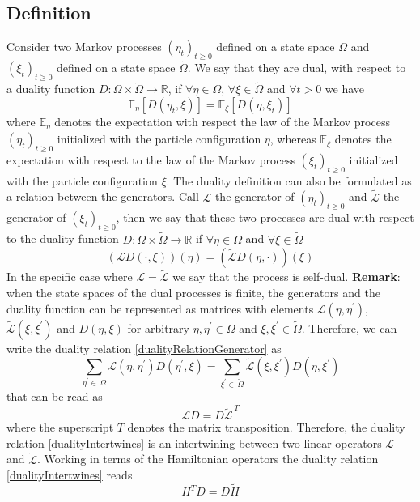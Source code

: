 \documentclass[10pt]{article}
\numberwithin{equation}{section}
\numberwithin{equation}{subsection}
\begin{document}
\subsection{Definition}
Consider two Markov processes $(\eta_{t})_{t\geq 0}$ defined on a state space $\Omega$ and $(\xi_{t})_{t\geq 0}$ defined on a state space $\widetilde{\Omega}$. We say that they are dual, with respect to a duality function $D:\Omega\times \widetilde{\Omega}\to \mathbb{R}$, if $\forall \eta\in\Omega$, $\forall \xi\in\widetilde{\Omega}$ and $\forall t> 0$ we have 
\begin{equation}
    \mathbb{E}_{\eta}\left[D(\eta_{t},\xi)\right]=\mathbb{E}_{\xi}\left[D(\eta,\xi_{t})\right]
\end{equation}
where $\mathbb{E}_{\eta}$ denotes the expectation with respect the law of the Markov process $(\eta_{t})_{t\geq 0}$ initialized with the particle configuration $\eta$, whereas $\mathbb{E}_{\xi}$ denotes the expectation with respect to the law of the Markov process $(\xi_{t})_{t\geq 0}$ initialized with the particle configuration $\xi$.
The duality definition can also be formulated as a relation between the generators. Call $\mathcal{L}$ the generator of $(\eta_{t})_{t\geq0}$ and $\widetilde{\mathcal{L}}$ the generator of $(\xi_{t})_{t\geq 0}$, then we say that these two processes are dual with respect to the duality function $D:\Omega\times \widetilde{\Omega}\to \mathbb{R}$ if $\forall \eta\in\Omega$ and $\forall \xi\in\widetilde{\Omega}$
\begin{equation}\label{dualityRelationGenerator}
    \left(\mathcal{L}D(\cdot,\xi)\right)(\eta)=\left(\widetilde{\mathcal{L}}D(\eta,\cdot)\right)(\xi)
\end{equation}
In the specific case where $\mathcal{L}=\widetilde{\mathcal{L}}$ we say that the process is self-dual.
\newline
\newline
\textbf{Remark}:
when the state spaces of the dual processes is finite, the generators and the duality function can be represented as matrices with elements $\mathcal{L}(\eta,\eta^{'})$, $\widetilde{\mathcal{L}}(\xi,\xi^{'})$ and $D(\eta,\xi)$ for arbitrary $\eta,\eta^{'}\in\Omega$ and $\xi,\xi^{'}\in \widetilde{\Omega}$. Therefore, we can write the duality relation \eqref{dualityRelationGenerator} as 
\begin{equation}
    \sum_{\eta^{'}\in\,\Omega}\mathcal{L}(\eta,\eta^{'})D(\eta^{'},\xi)=\sum_{\xi^{'}\in\, \widetilde{\Omega}}\widetilde{\mathcal{L}}(\xi,\xi^{'})D(\eta,\xi^{'})
\end{equation}
that can be read as
\begin{equation}\label{dualityIntertwines}
    \mathcal{L}D=D\widetilde{\mathcal{L}}^{\,T}
\end{equation}
where the superscript $T$ denotes the matrix transposition. Therefore, the duality relation \eqref{dualityIntertwines} is an intertwining between two linear operators $\mathcal{L}$ and $\widetilde{\mathcal{L}}$. Working in terms of the Hamiltonian operators the duality relation \eqref{dualityIntertwines} reads 
\begin{equation}\label{DualityRelation}
    H^{T}D=D\widetilde{H}
\end{equation}
\end{document}
